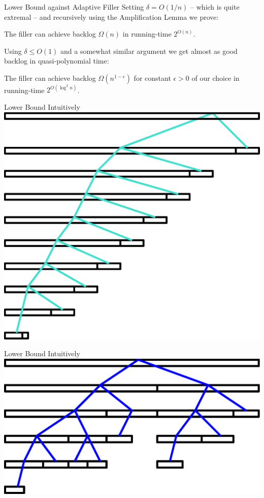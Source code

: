 \documentclass[xcolor=x11names, svgnames, rgb]{beamer}
\begin{document}
\begin{frame}[t]{Lower Bound against Adaptive Filler}
  Setting $\delta = O(1/n)$ -- which is quite extremal -- and recursively using
  the Amplification Lemma we prove:
  \begin{corollary}
    The filler can achieve backlog $\Omega(n)$ in running-time $2^{O(n)}$.
  \end{corollary}
  Using $\delta \le O(1)$ and a somewhat similar argument we get almost as good
  backlog in quasi-polynomial time:
  \begin{corollary}
    The filler can achieve backlog $\Omega(n^{1-\epsilon})$ for constant
    $\epsilon > 0$ of our choice in running-time $2^{O(\log^2 n)}$.
  \end{corollary}
\end{frame}

\begin{frame}[t]{Lower Bound Intuitively}
  \vspace{0.5cm}
  \includegraphics[width=0.7\linewidth]{amplificationImgs/expo_cor.eps}
\end{frame}

\begin{frame}[t]{Lower Bound Intuitively}
  \vspace{0.5cm}
  \includegraphics[width=0.7\linewidth]{amplificationImgs/quasipoly_cor.eps}
\end{frame}
\end{document}
